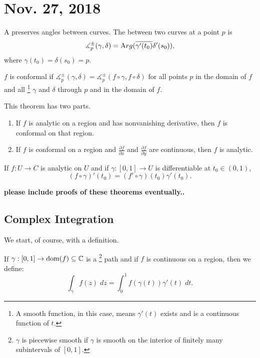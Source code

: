 \documentclass[notes]{subfile}
\begin{document}
\section{Nov. 27, 2018}

A  preserves angles between curves.
The  between two curves at a point $p$ is 
\[ \measuredangle_p^{\pm}(\gamma, \delta) = 
{\text Arg} (\overline{\gamma'(t_0)} \delta'(s_0)),\]
where $\gamma(t_0) = \delta(s_0) = p$.

\begin{definition}
    $f$ is conformal if $\measuredangle_p^{\pm}(\gamma, \delta) = \measuredangle_p^{\pm}(f \circ \gamma, f \circ \delta)$ 
    for all points $p$ in the domain of $f$ and all \footnote{A smooth function, in this case, means
    $\gamma'(t)$ exists and is a continuous function of $t$.} $\gamma$
    and $\delta$ through $p$ and in the domain of $f$.
\end{definition}
 
\begin{theorem}
    This theorem has two parts.
    \begin{enumerate}
        \item If $f$ is analytic on a region and has nonvanishing
            derivative, then $f$ is conformal on that region.

        \item If $f$ is conformal on a region and 
            $\frac{\partial f}{\partial x}$ and 
            $\frac{\partial f}{\partial y}$ are continuous,
            then $f$ is analytic.
    \end{enumerate}
\end{theorem}

\begin{lemma}
    If $f : U \to C$ is analytic on $U$ and if $\gamma : [0,1]
    \to U$ is differentiable at $t_0 \in (0,1)$,
    \[ (f \circ \gamma)' (t_0) = (f' \circ \gamma) (t_0)
    \gamma'(t_0). \]
\end{lemma}

\textbf{please include proofs of these theorems eventually..}



\subsection{Complex Integration}
We start, of course, with a definition.

\begin{definition}
    If $\gamma: [0,1] \to \operatorname{dom}(f) \subseteq \operatorname{\mathbb{C}}$ is a 
    \footnote{$\gamma$ is piecewise 
    smooth if $\gamma$ is smooth on the interior of finitely
    many subintervals of $[0,1]$.}
    path and if $f$ is continuous on a region,
    then we define:
    \[ \int_{\gamma} f(z) \; dz = \int_0^1 f(\gamma(t))\gamma'(t) \;dt. \]

\end{definition}
\end{document}
